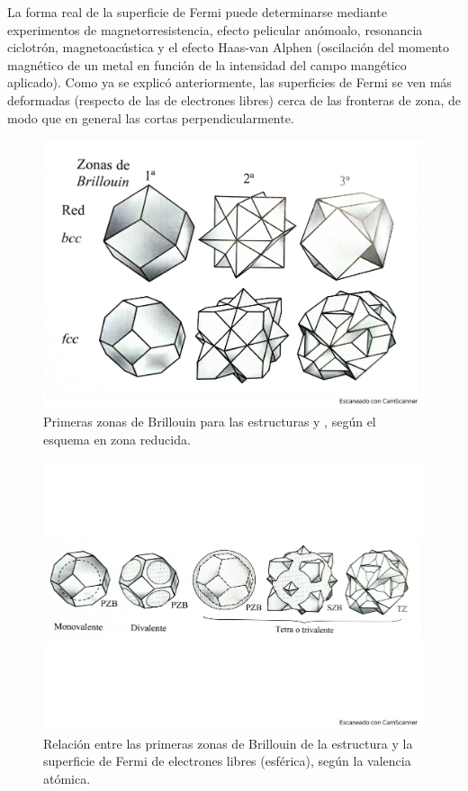 La forma real de la superficie de Fermi puede determinarse mediante experimentos de magnetorresistencia, efecto pelicular anómoalo, resonancia ciclotrón, magnetoacústica y el efecto Haas-van Alphen (oscilación del momento magnético de un metal en función de la intensidad del campo mangético aplicado). Como ya se explicó anteriormente, las superficies de Fermi se ven más deformadas (respecto de las de electrones libres) cerca de las fronteras de zona, de modo que en general las cortas perpendicularmente.
 
\begin{figure}[h!] \centering
    \includegraphics[scale=0.35]{Cuerpo/Ch_07/Fotos libro 8.pdf}
    \caption{Primeras zonas de Brillouin para las estructuras \bcc y \fcc, según el esquema en zona reducida.}
    \label{Fig:07-08}
\end{figure}    
\begin{figure}[h!] \centering
    \includegraphics[scale=0.45]{Cuerpo/Ch_07/Fotos libro 9.pdf}
    \caption{Relación entre las primeras zonas de Brillouin de la estructura \fcc y la superficie de Fermi de electrones libres (esférica), según la valencia atómica.}
    \label{Fig:07-09}
\end{figure}    


